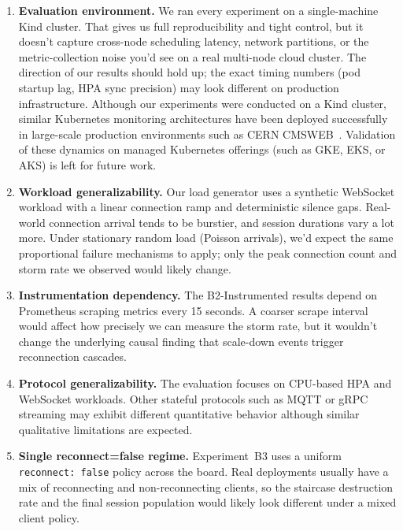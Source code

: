 \documentclass[twocolumn]{svjour3}
\begin{document}
\begin{enumerate}[leftmargin=*]

\item \textbf{Evaluation environment.} We ran every experiment on a single-machine
Kind cluster. That gives us full reproducibility and tight control, but it doesn't
capture cross-node scheduling latency, network partitions, or the metric-collection
noise you'd see on a real multi-node cloud cluster. The direction of our results
should hold up; the exact timing numbers (pod startup lag, HPA sync precision) may
look different on production infrastructure. Although our experiments were conducted on a Kind cluster, similar Kubernetes monitoring architectures have been deployed successfully in large-scale production environments such as CERN CMSWEB~\cite{tedeschi2021cmsweb, ali2024cmsweb}. Validation of these dynamics on managed Kubernetes offerings (such as GKE, EKS, or AKS) is left for future work.

\item \textbf{Workload generalizability.} Our load generator uses a synthetic
WebSocket workload with a linear connection ramp and deterministic silence gaps.
Real-world connection arrival tends to be burstier, and session durations vary a
lot more. Under stationary random load (Poisson arrivals), we'd expect the same
proportional failure mechanisms to apply; only the peak connection count and storm
rate we observed would likely change.

\item \textbf{Instrumentation dependency.} The B2-Instrumented results depend on
Prometheus scraping metrics every 15 seconds. A coarser scrape interval would
affect how precisely we can measure the storm rate, but it wouldn't change the
underlying causal finding that scale-down events trigger reconnection cascades.

\item \textbf{Protocol generalizability.} The evaluation focuses on CPU-based HPA and WebSocket workloads. Other stateful protocols such as MQTT or gRPC streaming may exhibit different quantitative behavior although similar qualitative limitations are expected.

\item \textbf{Single reconnect=false regime.} Experiment~B3 uses a uniform
\texttt{reconnect: false} policy across the board. Real deployments usually have a
mix of reconnecting and non-reconnecting clients, so the staircase destruction rate
and the final session population would likely look different under a mixed
client policy.

\end{enumerate}
\end{document}
